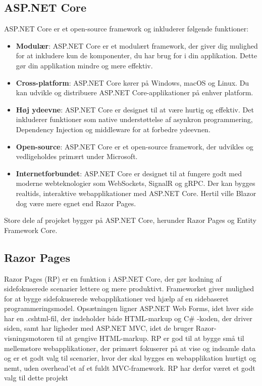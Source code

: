 \subsection{ASP.NET Core}
ASP.NET Core er et open-source framework og inkluderer følgende funktioner:
\begin{itemize}
    \item \textbf{Modulær}: ASP.NET Core er et modulært framework, der giver dig mulighed for at inkludere kun de komponenter, du har brug for i din applikation. Dette gør din applikation mindre og mere effektiv.
    \item \textbf{Cross-platform}: ASP.NET Core kører på Windows, macOS og Linux. Du kan udvikle og distribuere ASP.NET Core-applikationer på enhver platform.
    \item \textbf{Høj ydeevne}: ASP.NET Core er designet til at være hurtig og effektiv. Det inkluderer funktioner som native understøttelse af asynkron programmering, Dependency Injection og middleware for at forbedre ydeevnen.
    \item \textbf{Open-source}: ASP.NET Core er et open-source framework, der udvikles og vedligeholdes primært under Microsoft.
    \item \textbf{Internetforbundet}: ASP.NET Core er designet til at fungere godt med moderne webteknologier som WebSockets, SignalR og gRPC. Der kan bygges realtids, interaktive webapplikationer med ASP.NET Core. Hertil ville Blazor dog være mere egnet end Razor Pages.
\end{itemize}
Store dele af projeket bygger på ASP.NET Core, herunder Razor Pages og Entity Framework Core.

\subsection{Razor Pages}
Razor Pages (RP) er en funktion i ASP.NET Core, der gør kodning af sidefokuserede scenarier lettere og mere produktivt.
Frameworket giver mulighed for at bygge sidefokuserede webapplikationer ved hjælp af en sidebaseret programmeringsmodel. 
Opsætningen ligner ASP.NET Web Forms, idet hver side har en .cshtml-fil, der indeholder både HTML-markup og C\# -koden, der driver siden, samt har ligheder med ASP.NET MVC, idet de bruger Razor-visningsmotoren til at gengive HTML-markup.
RP er god til at bygge små til mellemstore webapplikationer, der primært fokuserer på at vise og indsamle data og er et godt valg til scenarier, hvor der skal bygges en webapplikation hurtigt og nemt, uden overhead'et af et fuldt MVC-framework.
RP har derfor været et godt valg til dette projekt

